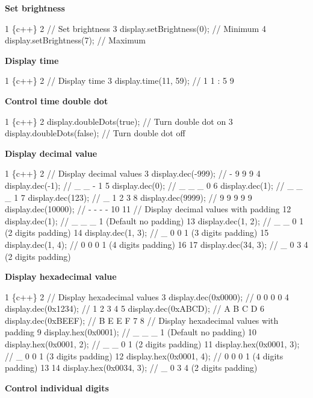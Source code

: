 {\bfseries Set brightness}


\begin{DoxyCode}
1 \{c++\}
2 // Set brightness
3 display.setBrightness(0); // Minimum
4 display.setBrightness(7); // Maximum
\end{DoxyCode}


{\bfseries Display time}


\begin{DoxyCode}
1 \{c++\}
2 // Display time
3 display.time(11, 59);   // 1 1 : 5 9
\end{DoxyCode}


{\bfseries Control time double dot}


\begin{DoxyCode}
1 \{c++\}
2 display.doubleDots(true);   // Turn double dot on
3 display.doubleDots(false);  // Turn double dot off
\end{DoxyCode}


{\bfseries Display decimal value}


\begin{DoxyCode}
1 \{c++\}
2 // Display decimal values
3 display.dec(-999);  // - 9 9 9
4 display.dec(-1);    // \_ \_ - 1
5 display.dec(0);     // \_ \_ \_ 0
6 display.dec(1);     // \_ \_ \_ 1
7 display.dec(123);   // \_ 1 2 3
8 display.dec(9999);  // 9 9 9 9
9 display.dec(10000); // - - - -
10 
11 // Display decimal values with padding
12 display.dec(1);     // \_ \_ \_ 1  (Default no padding)
13 display.dec(1, 2);  // \_ \_ 0 1  (2 digits padding)
14 display.dec(1, 3);  // \_ 0 0 1  (3 digits padding)
15 display.dec(1, 4);  // 0 0 0 1  (4 digits padding)
16 
17 display.dec(34, 3); // \_ 0 3 4  (2 digits padding)
\end{DoxyCode}


{\bfseries Display hexadecimal value}


\begin{DoxyCode}
1 \{c++\}
2 // Display hexadecimal values
3 display.dec(0x0000);    // 0 0 0 0
4 display.dec(0x1234);    // 1 2 3 4
5 display.dec(0xABCD);    // A B C D
6 display.dec(0xBEEF);    // B E E F
7 
8 // Display hexadecimal values with padding
9 display.hex(0x0001);    // \_ \_ \_ 1  (Default no padding)
10 display.hex(0x0001, 2); // \_ \_ 0 1  (2 digits padding)
11 display.hex(0x0001, 3); // \_ 0 0 1  (3 digits padding)
12 display.hex(0x0001, 4); // 0 0 0 1  (4 digits padding)
13 
14 display.hex(0x0034, 3); // \_ 0 3 4  (2 digits padding)
\end{DoxyCode}


{\bfseries Control individual digits}


